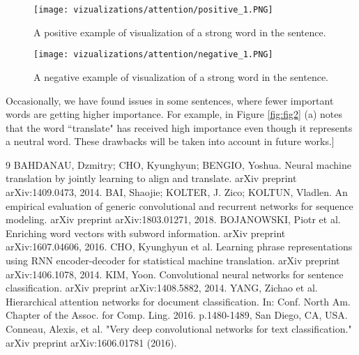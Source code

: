 \documentclass[runningheads]{llncs}
\begin{document}
\begin{figure*}[!ht]
  \center
  \begin{subfigure}{\linewidth}
    \center
      \texttt{[image: vizualizations/attention/positive\_1.PNG]}
      \caption{A positive example of visualization of a strong word in the sentence.}  
  \end{subfigure}\par\medskip
  
  \begin{subfigure}{\linewidth}
   \center
   \texttt{[image: vizualizations/attention/negative\_1.PNG]}
   \caption{A negative example of visualization of a strong word in the sentence.}
  \end{subfigure}\par\medskip
\vspace{-2mm}
  \caption{Visualization of attention weights computed by the proposed model}
  \label{fig:fig2}
\end{figure*}

\vspace{-4mm}

Occasionally, we have found issues in some sentences, where fewer important words are getting higher importance. For example, in Figure \ref{fig:fig2} (a) notes that the word ``translate" has received high importance even though it represents a neutral word. These drawbacks will be taken into account in future works.\-8mm] 







\begin{thebibliography}{9}
 BAHDANAU, Dzmitry; CHO, Kyunghyun; BENGIO, Yoshua. Neural machine translation by jointly learning to align and translate. arXiv preprint arXiv:1409.0473, 2014.
 BAI, Shaojie; KOLTER, J. Zico; KOLTUN, Vladlen. An empirical evaluation of generic convolutional and recurrent networks for sequence modeling. arXiv preprint arXiv:1803.01271, 2018.
 BOJANOWSKI, Piotr et al. Enriching word vectors with subword information. arXiv preprint arXiv:1607.04606, 2016.
CHO, Kyunghyun et al. Learning phrase representations using RNN encoder-decoder for statistical machine translation. arXiv preprint arXiv:1406.1078, 2014.
KIM, Yoon. Convolutional neural networks for sentence classification. arXiv preprint arXiv:1408.5882, 2014.
 YANG, Zichao et al. Hierarchical attention networks for document classification. In: Conf. North Am. Chapter of the Assoc. for Comp. Ling. 2016. p.1480-1489, San Diego, CA, USA.
 Conneau, Alexis, et al. "Very deep convolutional networks for text classification." arXiv preprint arXiv:1606.01781 (2016).
\end{thebibliography}
\end{document}
